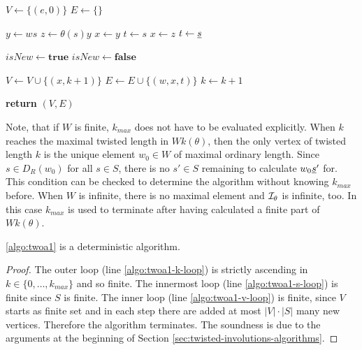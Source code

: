 \begin{algo}[TWOA1]
	\hfill
	\begin{algorithmic}[1]
	\State $V \gets \{(e,0)\}$
	\State $E \gets \{\}$

	 \label{algo:twoa1-k-loop}
		 \label{algo:twoa1-v-loop}
			 \label{algo:twoa1-s-loop} 
				\State $y \gets ws$
				\State $z \gets \theta(s)y$
				 \label{algo:twoa1-check-one-or-bothsided}
					\State $x \gets y$
					\State $t \gets s$
				\Else
					\State $x \gets z$
					\State $t \gets \underline{s}$
				\EndIf
				
				\State $isNew \gets \textbf{true}$
				 \label{algo:twoa1-comp} 
						\State $isNew \gets \textbf{false}$
					\EndIf
				\EndFor
				
					\State $V \gets V \cup \{ (x,k+1) \}$
				\EndIf
				\State $E \gets E \cup \{ (w,x,t) \}$
			\EndFor
		\EndFor
		\State $k \gets k + 1$
	\EndFor

	\State \textbf{return} $(V,E)$
	\EndProcedure
	\end{algorithmic}
\end{algo}

Note, that if $W$ is finite, $k_{max}$ does not have to be evaluated explicitly. When $k$ reaches the maximal twisted length in $Wk(\theta)$, then the only vertex of twisted length $k$ is the unique element $w_0 \in W$ of maximal ordinary length. Since $s \in D_R(w_0)$ for all $s \in S$, there is no $s' \in S$ remaining to calculate $w_0 \underline{s}'$ for. This condition can be checked to determine the algorithm without knowing $k_{max}$ before. When $W$ is infinite, there is no maximal element and $\mathcal{I}_{\theta}$ is infinite, too. In this case $k_{max}$ is used to terminate after having calculated a finite part of $Wk(\theta)$.

\begin{lemm}
	\ref{algo:twoa1} is a deterministic algorithm.

	\begin{proof}
		The outer loop (line \ref{algo:twoa1-k-loop}) is strictly ascending in $k \in \{0,\ldots,k_{max}\}$ and so finite. The innermost loop (line \ref{algo:twoa1-s-loop}) is finite since $S$ is finite. The inner loop (line \ref{algo:twoa1-v-loop}) is finite, since $V$ starts as finite set and in each step there are added at most $|V| \cdot |S|$ many new vertices. Therefore the algorithm terminates. The soundness is due to the arguments at the beginning of Section \ref{sec:twisted-involutions-algorithms}.
	\end{proof}
\end{lemm}

